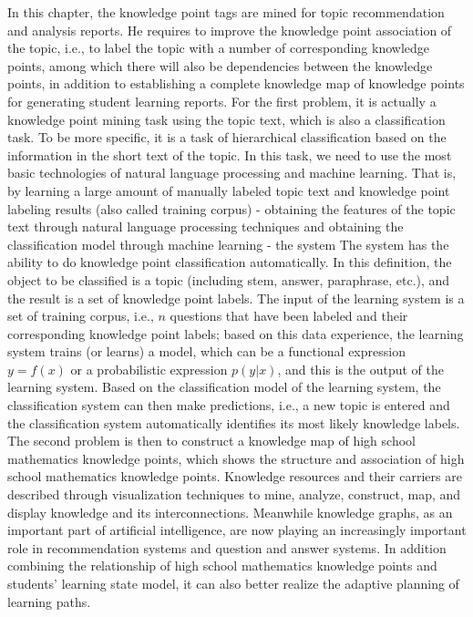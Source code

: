 In this chapter, the knowledge point tags are mined for topic recommendation and analysis reports. He requires to improve the knowledge point association of the topic, i.e., to label the topic with a number of corresponding knowledge points, among which there will also be dependencies between the knowledge points, in addition to establishing a complete knowledge map of knowledge points for generating student learning reports. For the first problem, it is actually a knowledge point mining task using the topic text, which is also a classification task. To be more specific, it is a task of hierarchical classification based on the information in the short text of the topic. In this task, we need to use the most basic technologies of natural language processing and machine learning. That is, by learning a large amount of manually labeled topic text and knowledge point labeling results (also called training corpus) - obtaining the features of the topic text through natural language processing techniques and obtaining the classification model through machine learning - the system The system has the ability to do knowledge point classification automatically. In this definition, the object to be classified is a topic (including stem, answer, paraphrase, etc.), and the result is a set of knowledge point labels. The input of the learning system is a set of training corpus, i.e., \(n\) questions that have been labeled and their corresponding knowledge point labels; based on this data experience, the learning system trains (or learns) a model, which can be a functional expression \(y=f(x)\) or a probabilistic expression \(p(y|x)\), and this is the output of the learning system. Based on the classification model of the learning system, the classification system can then make predictions, i.e., a new topic is entered and the classification system automatically identifies its most likely knowledge labels. The second problem is then to construct a knowledge map of high school mathematics knowledge points, which shows the structure and association of high school mathematics knowledge points. Knowledge resources and their carriers are described through visualization techniques to mine, analyze, construct, map, and display knowledge and its interconnections. Meanwhile knowledge graphs, as an important part of artificial intelligence, are now playing an increasingly important role in recommendation systems and question and answer systems. In addition combining the relationship of high school mathematics knowledge points and students' learning state model, it can also better realize the adaptive planning of learning paths.

